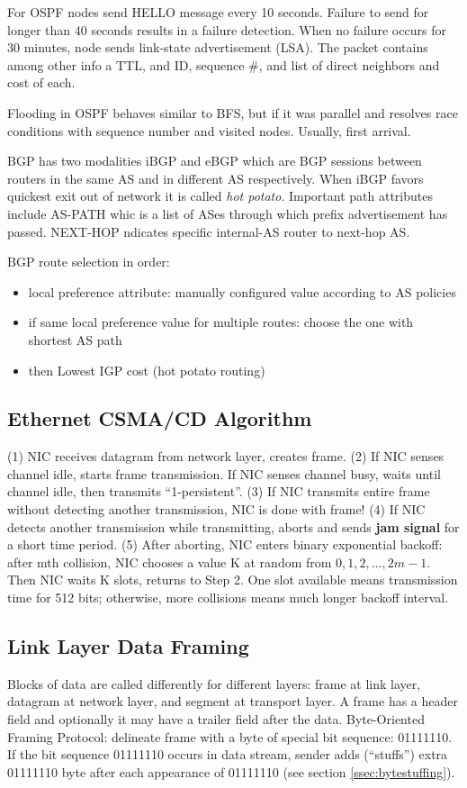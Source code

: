 For OSPF nodes send HELLO message every 10 seconds. Failure to send for
longer than 40 seconds results in a failure detection. When no failure
occurs for 30 minutes, node sends link-state advertisement (LSA). The
packet contains among other info a TTL, and ID, sequence \#, and list of
direct neighbors and cost of each.

Flooding in OSPF behaves similar to BFS, but if it was parallel and
resolves race conditions with sequence number and visited nodes.
Usually, first arrival.

BGP has two modalities iBGP and eBGP which are BGP sessions between
routers in the same AS and in different AS respectively. When iBGP
favors quickest exit out of network it is called \textit{hot potato}.
Important path attributes include AS-PATH whic is a list of ASes through
which prefix advertisement has passed. NEXT-HOP ndicates specific
internal-AS router to next-hop AS.

BGP route selection in order:
\begin{itemize}[itemsep=0em]
  \item local preference attribute: manually configured value according to AS policies
  \item if same local preference value for multiple routes: choose the one with shortest AS path
  \item then Lowest IGP cost (hot potato routing)
\end{itemize}
\subsection{Ethernet CSMA/CD Algorithm}
(1) NIC receives datagram from network layer, creates frame. (2) If NIC
senses channel idle, starts frame transmission. If NIC senses channel
busy, waits until channel idle, then transmits ``1-persistent''. (3) If
NIC transmits entire frame without detecting another transmission, NIC
is done with frame! (4) If NIC detects another transmission while
transmitting, aborts and sends \textbf{jam signal} for a short time
period. (5) After aborting, NIC enters binary exponential backoff: after
mth collision, NIC chooses a value K at random from ${0,1,2,\dots, 2m -
1}$. Then NIC waits K slots, returns to Step 2. One slot available means
transmission time for 512 bits; otherwise, more collisions means much
longer backoff interval.
\subsection{Link Layer Data Framing}
Blocks of data are called differently for different layers: frame at
link layer, datagram at network layer, and segment at transport layer. A
frame has a header field and optionally it may have a trailer field
after the data. Byte-Oriented Framing Protocol: delineate frame with a
byte of special bit sequence: 01111110. If the bit sequence 01111110
occurs in data stream, sender adds (“stuffs”) extra 01111110 byte after
each appearance of 01111110 (see section \ref{ssec:bytestuffing}).